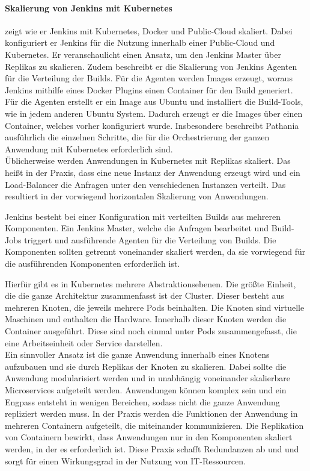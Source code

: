 \paragraph{Skalierung von Jenkins mit Kubernetes}
\label{jenkins:skalierung}
\citet{Pathania2017} zeigt wie er Jenkins mit Kubernetes, Docker und Public-Cloud skaliert. Dabei konfiguriert er Jenkins für die Nutzung innerhalb einer Public-Cloud und Kubernetes. Er veranschaulicht einen Ansatz, um den Jenkins Master über Replikas zu skalieren. Zudem beschreibt er die Skalierung von Jenkins Agenten für die Verteilung der Builds. Für die Agenten werden Images erzeugt, woraus Jenkins mithilfe eines Docker Plugins einen Container für den Build generiert. Für die Agenten erstellt er ein Image aus Ubuntu und installiert die Build-Tools, wie in jedem anderen Ubuntu System.
Dadurch erzeugt er die Images über einen Container, welches vorher konfiguriert wurde. Insbesondere beschreibt Pathania ausführlich die einzelnen Schritte, die für die Orchestrierung der ganzen Anwendung mit Kubernetes erforderlich sind.
\medskip
\\
Üblicherweise werden Anwendungen in Kubernetes mit Replikas skaliert. Das heißt in der Praxis, dass eine neue Instanz der Anwendung erzeugt wird und ein Load-Balancer die Anfragen unter den verschiedenen Instanzen verteilt. Das resultiert in der vorwiegend horizontalen Skalierung von Anwendungen. 

Jenkins besteht bei einer Konfiguration mit verteilten Builds aus mehreren Komponenten. Ein Jenkins Master, welche die Anfragen bearbeitet und Build-Jobs triggert und ausführende Agenten für die Verteilung von Builds. Die Komponenten sollten getrennt voneinander skaliert werden, da sie vorwiegend für die ausführenden Komponenten erforderlich ist. 

Hierfür gibt es in Kubernetes mehrere Abstraktionsebenen. Die größte Einheit, die die ganze Architektur zusammenfasst ist der Cluster. Dieser besteht aus mehreren Knoten, die jeweils mehrere Pods beinhalten. Die Knoten sind virtuelle Maschinen und enthalten die Hardware. Innerhalb dieser Knoten werden die Container ausgeführt. Diese sind noch einmal unter Pods zusammengefasst, die eine Arbeitseinheit oder Service darstellen. 
\medskip
\\
Ein sinnvoller Ansatz ist die ganze Anwendung innerhalb eines Knotens aufzubauen und sie durch Replikas der Knoten zu skalieren. Dabei sollte die Anwendung modularisiert werden und in unabhängig voneinander skalierbare Microservices aufgeteilt werden. Anwendungen können komplex sein und ein Engpass entsteht in wenigen Bereichen, sodass nicht die ganze Anwendung repliziert werden muss. In der Praxis werden die Funktionen der Anwendung in mehreren Containern aufgeteilt, die miteinander kommunizieren. Die Replikation von Containern bewirkt, dass Anwendungen nur in den Komponenten skaliert werden, in der es erforderlich ist. Diese Praxis schafft Redundanzen ab und und sorgt für einen Wirkungsgrad in der Nutzung von IT-Ressourcen.


